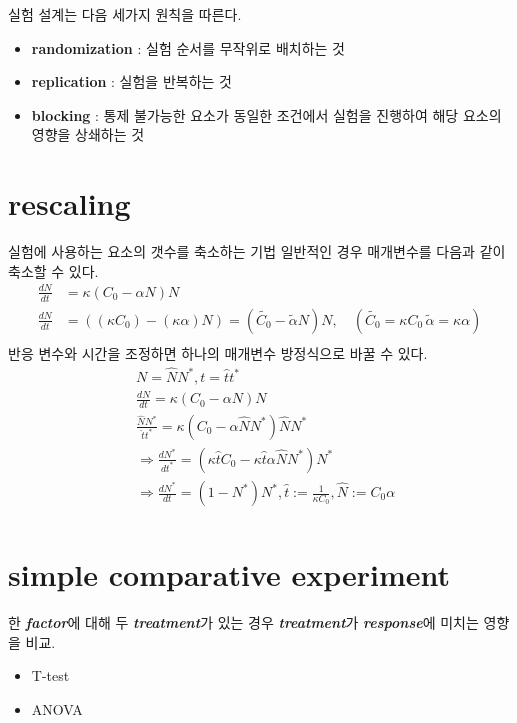 \documentclass{article}
\begin{document}
    실험 설계는 다음 세가지 원칙을 따른다.
    \begin{itemize}
        \item \textbf{randomization} : 실험 순서를 무작위로 배치하는 것
        \item \textbf{replication} : 실험을 반복하는 것
        \item \textbf{blocking} : 통제 불가능한 요소가 동일한 조건에서 실험을 진행하여 해당 요소의 영향을 상쇄하는 것
    \end{itemize}

    \section{rescaling}
    실험에 사용하는 요소의 갯수를 축소하는 기법
    일반적인 경우 매개변수를 다음과 같이 축소할 수 있다.
    \begin{align*}
        \frac{dN}{dt} &= \kappa(C_0 -\alpha N)N \\
        \frac{dN}{dt} &= ((\kappa C_0)-(\kappa \alpha)N) = (\widetilde{C_0}-\widetilde{\alpha}N)N, \quad (\widetilde{C_0} = \kappa C_0 \, \widetilde{\alpha} = \kappa\alpha)\\
    \end{align*}
    반응 변수와 시간을 조정하면 하나의 매개변수 방정식으로 바꿀 수 있다.
    \begin{align*}
        &N = \hat{N}N^*, t = \hat{t}t^*\\
        &\frac{dN}{dt} = \kappa(C_0 -\alpha N)N \\
        &\frac{\hat{N}N^*}{\hat{t}t^*} = \kappa(C_0 -\alpha \hat{N}N^*)\hat{N}N^*\\
        &\Rightarrow \frac{dN^*}{dt^*} = (\kappa\hat{t}C_0-\kappa\hat{t}\alpha\hat{N}N^*)N^*\\
        &\Rightarrow \frac{dN^*}{dt} = (1-N^*)N^* , \hat{t} := \frac{1}{\kappa C_0}, \hat{N} := C_0\alpha\\
    \end{align*}

    

    \section{simple comparative experiment}
    한 \textbf{\textit{factor}}에 대해 두 \textbf{\textit{treatment}}가 있는 경우 \textbf{\textit{treatment}}가 \textbf{\textit{response}}에 미치는 영향을 비교.
    \begin{itemize}
        \item T-test
        \item ANOVA
    \end{itemize}
\end{document}
